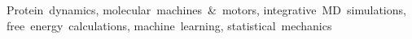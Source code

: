 
\begin{cventries}

Protein~dynamics, molecular~machines~\&~motors, integrative~MD~simulations, free~energy~calculations, machine~learning, statistical~mechanics

\end{cventries}
